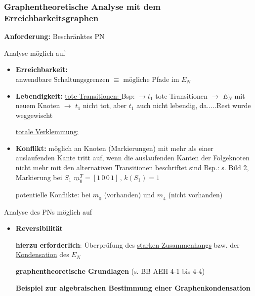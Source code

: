 \subsubsection{Graphentheoretische Analyse mit dem Erreichbarkeitsgraphen}
\textbf{Anforderung:} Beschränktes PN

Analyse möglich auf 
\begin{itemize}
	\item{\textbf{Erreichbarkeit:}} \\
	anwendbare Schaltungsgrenzen $\equiv$ mögliche Pfade im $E_N$
	\item{\textbf{Lebendigkeit:}} \subitem{-} \underline{tote Transitionen: }  \newline
 	\subsubitem Bsp: %
	$\rightarrow t_1$ tote Transitionen
	$\rightarrow$ $E_N$ mit neuem Knoten $\rightarrow$ $t_1$ nicht tot, aber $t_1$ auch nicht lebendig, da.....Rest wurde weggewischt %
	

	
	
	\subitem{-} \underline{totale Verklemmung:} \\
	\item{\textbf{Konflikt:}} 
	\subitem{-} möglich an Knoten (Markierungen) mit mehr als einer auslaufenden Kante
	\subitem{-} tritt auf, wenn die auslaufenden Kanten der Folgeknoten nicht mehr mit den alternativen Transitionen beschriftet sind  %
	Bsp.: s. Bild 2, Markierung bei $S_1$
	$\underline{m}_0^{T} = [1\, 0\, 0\,  1] \, , \, k(S_1) = 1$
	
	potentielle Konflikte: bei $\underline{m}_0$ (vorhanden) und $\underline{m}_4$ (nicht vorhanden)
\end{itemize}


Analyse des PNs möglich auf
\begin{itemize}
	\item{\textbf{Reversibilität}}  
	
	\textbf{hierzu erforderlich}: Überprüfung des \underline{starken Zusammenhangs} bzw. der \underline{Kondensation} des $E_N$
	
	\textbf{graphentheoretische Grundlagen} (s. BB AEH 4-1 bis 4-4)
	
	\textbf{Beispiel zur algebraischen Bestimmung einer Graphenkondensation}
	
\end{itemize}